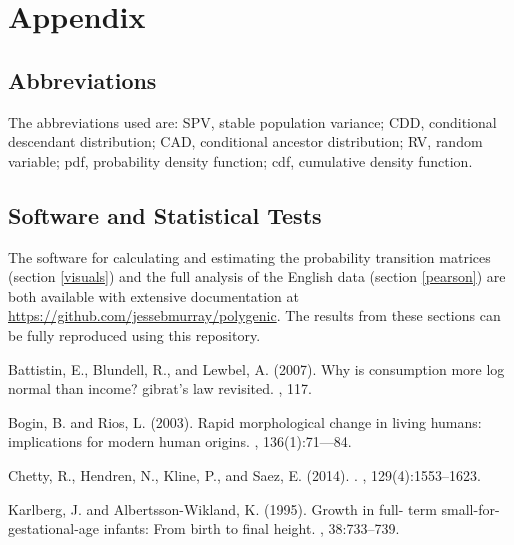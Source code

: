 \documentclass{svproc} %
\begin{document}
{%
\section{Appendix}

\subsection{Abbreviations}

The abbreviations used are: SPV, stable population variance; CDD, conditional descendant distribution; CAD, conditional ancestor distribution; RV, random variable; pdf, probability density function; cdf, cumulative density function.


\subsection{Software and Statistical Tests} \label{links}
The software for calculating and estimating the probability transition matrices (section \ref{visuals}) and the full analysis of the English data (section \ref{pearson}) are both available with extensive documentation at \href{https://github.com/jessebmurray/polygenic}{https://github.com/jessebmurray/polygenic}. The results from these sections can be fully reproduced using this repository. 


\begin{thebibliography}{6}

Battistin, E., Blundell, R., and Lewbel, A. (2007).
\newblock Why is consumption more log normal than income? gibrat’s law
  revisited.
, 117.

Bogin, B. and Rios, L. (2003).
\newblock Rapid morphological change in living humans: implications for modern
  human origins.
, 136(1):71---84.

Chetty, R., Hendren, N., Kline, P., and Saez, E. (2014).
.
, 129(4):1553--1623.

Karlberg, J. and Albertsson-Wikland, K. (1995).
\newblock Growth in full- term small-for-gestational-age infants: From birth to
  final height.
, 38:733--739.


\end{thebibliography}}
\end{document}
